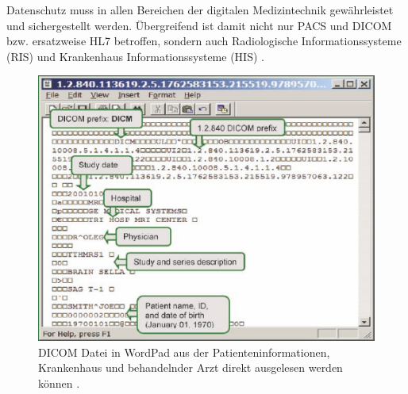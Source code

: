 Datenschutz muss in allen Bereichen der digitalen Medizintechnik gewährleistet und sichergestellt werden. Übergreifend ist damit nicht nur PACS und DICOM bzw. ersatzweise HL7 betroffen, sondern auch Radiologische Informationssysteme (RIS) und Krankenhaus Informationssysteme (HIS) \cite{DICOM}. 

\begin{figure} [t!]
	\includegraphics[scale = 0.7]{Content/Pictures/DICOMEditor.png}
	\caption{DICOM Datei in WordPad aus der Patienteninformationen, Krankenhaus und behandelnder Arzt direkt ausgelesen werden können \cite{DICOM}.}
	\label{fig:dicom}
\end{figure}
